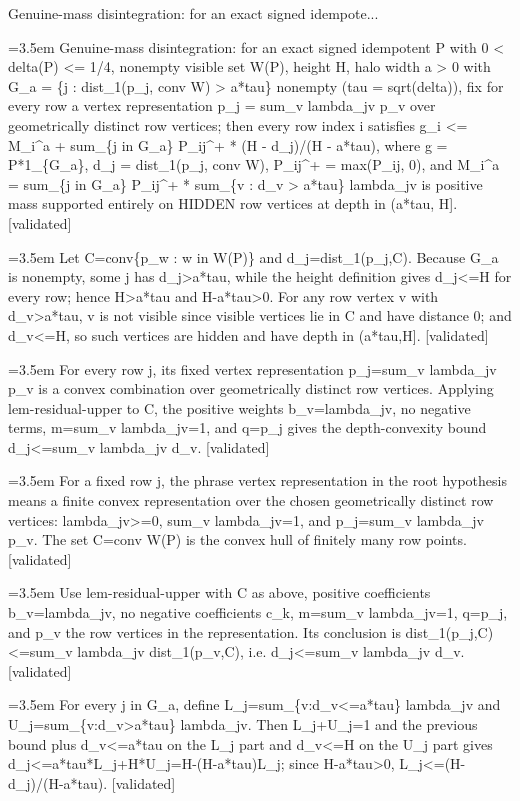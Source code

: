 \documentclass{article}
\newcommand{\step}[1]{\par\noindent\hangindent=3.5em\hangafter=1%
  \makebox[3.5em][l]{\textbf{#1.}}}
\newcommand{\steptag}[1]{\hfill{\small\textsf{[#1]}}}
\begin{document}
\begin{proofbox}{Genuine-mass disintegration: for an exact signed idempote...}
\step{1} Genuine-mass disintegration: for an exact signed idempotent P with 0 < delta(P) <= 1/4, nonempty visible set W(P), height H, halo width a > 0 with G\_a = \{j : dist\_1(p\_j, conv W) > a*tau\} nonempty (tau = sqrt(delta)), fix for every row a vertex representation p\_j = sum\_v lambda\_jv p\_v over geometrically distinct row vertices; then every row index i satisfies g\_i <= M\_i\textasciicircum{}a + sum\_\{j in G\_a\} P\_ij\textasciicircum{}+ * (H - d\_j)/(H - a*tau), where g = P*1\_\{G\_a\}, d\_j = dist\_1(p\_j, conv W), P\_ij\textasciicircum{}+ = max(P\_ij, 0), and M\_i\textasciicircum{}a = sum\_\{j in G\_a\} P\_ij\textasciicircum{}+ * sum\_\{v : d\_v > a*tau\} lambda\_jv is positive mass supported entirely on HIDDEN row vertices at depth in (a*tau, H]. \steptag{validated} \\[6pt]
\step{1.1} Let C=conv\{p\_w : w in W(P)\} and d\_j=dist\_1(p\_j,C). Because G\_a is nonempty, some j has d\_j>a*tau, while the height definition gives d\_j<=H for every row; hence H>a*tau and H-a*tau>0. For any row vertex v with d\_v>a*tau, v is not visible since visible vertices lie in C and have distance 0; and d\_v<=H, so such vertices are hidden and have depth in (a*tau,H]. \steptag{validated} \\[4pt]
\step{1.2} For every row j, its fixed vertex representation p\_j=sum\_v lambda\_jv p\_v is a convex combination over geometrically distinct row vertices. Applying lem-residual-upper to C, the positive weights b\_v=lambda\_jv, no negative terms, m=sum\_v lambda\_jv=1, and q=p\_j gives the depth-convexity bound d\_j<=sum\_v lambda\_jv d\_v. \steptag{validated} \\[6pt]
\step{1.2.1} For a fixed row j, the phrase vertex representation in the root hypothesis means a finite convex representation over the chosen geometrically distinct row vertices: lambda\_jv>=0, sum\_v lambda\_jv=1, and p\_j=sum\_v lambda\_jv p\_v. The set C=conv W(P) is the convex hull of finitely many row points. \steptag{validated} \\[4pt]
\step{1.2.2} Use lem-residual-upper with C as above, positive coefficients b\_v=lambda\_jv, no negative coefficients c\_k, m=sum\_v lambda\_jv=1, q=p\_j, and p\_v the row vertices in the representation. Its conclusion is dist\_1(p\_j,C)<=sum\_v lambda\_jv dist\_1(p\_v,C), i.e. d\_j<=sum\_v lambda\_jv d\_v. \steptag{validated} \\[4pt]
\step{1.3} For every j in G\_a, define L\_j=sum\_\{v:d\_v<=a*tau\} lambda\_jv and U\_j=sum\_\{v:d\_v>a*tau\} lambda\_jv. Then L\_j+U\_j=1 and the previous bound plus d\_v<=a*tau on the L\_j part and d\_v<=H on the U\_j part gives d\_j<=a*tau*L\_j+H*U\_j=H-(H-a*tau)L\_j; since H-a*tau>0, L\_j<=(H-d\_j)/(H-a*tau). \steptag{validated} \\[6pt]

\end{proofbox}
\end{document}
